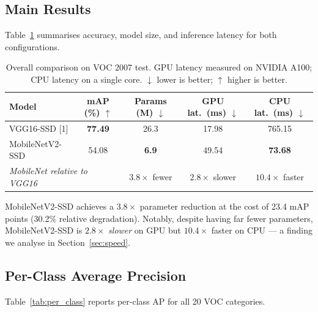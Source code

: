 \documentclass{article}
\begin{document}
\subsection{Main Results}

Table~\ref{tab:main_results} summarises accuracy, model size, and inference latency for both configurations.

\begin{table}[h]
  \caption{Overall comparison on VOC 2007 test. GPU latency measured on NVIDIA A100; CPU latency on a single core. $\downarrow$ lower is better; $\uparrow$ higher is better.}
  \label{tab:main_results}
  \centering
  \begin{tabular}{lcccc}
    \toprule
    Model & mAP (\%) $\uparrow$ & Params (M) $\downarrow$ & GPU lat.\ (ms) $\downarrow$ & CPU lat.\ (ms) $\downarrow$ \\
    \midrule
    VGG16-SSD [1]       & \textbf{77.49} & 26.3          & 17.98          & 765.15 \\
    MobileNetV2-SSD     & 54.08          & \textbf{6.9}  & 49.54          & \textbf{73.68} \\
    \midrule
    \multicolumn{2}{l}{\textit{MobileNet relative to VGG16}} & $3.8\times$ fewer & $2.8\times$ slower & $10.4\times$ faster \\
    \bottomrule
  \end{tabular}
\end{table}

MobileNetV2-SSD achieves a $3.8\times$ parameter reduction at the cost of 23.4 mAP points (30.2\% relative degradation). Notably, despite having far fewer parameters, MobileNetV2-SSD is $2.8\times$ \emph{slower} on GPU but $10.4\times$ faster on CPU — a finding we analyse in Section~\ref{sec:speed}.

\subsection{Per-Class Average Precision}

Table~\ref{tab:per_class} reports per-class AP for all 20 VOC categories.
\end{document}
